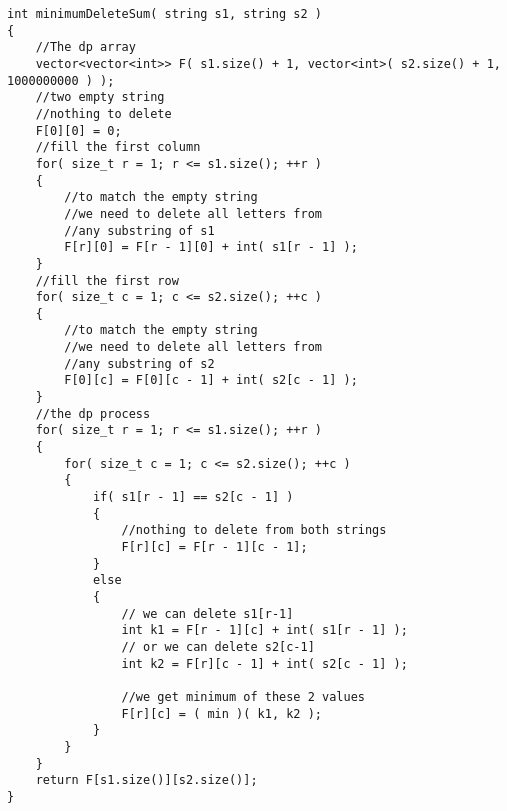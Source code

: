 \setcounter{lstlisting}{0}
\begin{lstlisting}[style=customc, caption={Dynamic Programming}]
int minimumDeleteSum( string s1, string s2 )
{
    //The dp array
    vector<vector<int>> F( s1.size() + 1, vector<int>( s2.size() + 1, 1000000000 ) );
    //two empty string
    //nothing to delete
    F[0][0] = 0;
    //fill the first column
    for( size_t r = 1; r <= s1.size(); ++r )
    {
        //to match the empty string
        //we need to delete all letters from
        //any substring of s1
        F[r][0] = F[r - 1][0] + int( s1[r - 1] );
    }
    //fill the first row
    for( size_t c = 1; c <= s2.size(); ++c )
    {
        //to match the empty string
        //we need to delete all letters from
        //any substring of s2
        F[0][c] = F[0][c - 1] + int( s2[c - 1] );
    }
    //the dp process
    for( size_t r = 1; r <= s1.size(); ++r )
    {
        for( size_t c = 1; c <= s2.size(); ++c )
        {
            if( s1[r - 1] == s2[c - 1] )
            {
                //nothing to delete from both strings
                F[r][c] = F[r - 1][c - 1];
            }
            else
            {
                // we can delete s1[r-1]
                int k1 = F[r - 1][c] + int( s1[r - 1] );
                // or we can delete s2[c-1]
                int k2 = F[r][c - 1] + int( s2[c - 1] );

                //we get minimum of these 2 values
                F[r][c] = ( min )( k1, k2 );
            }
        }
    }
    return F[s1.size()][s2.size()];
}
\end{lstlisting}


